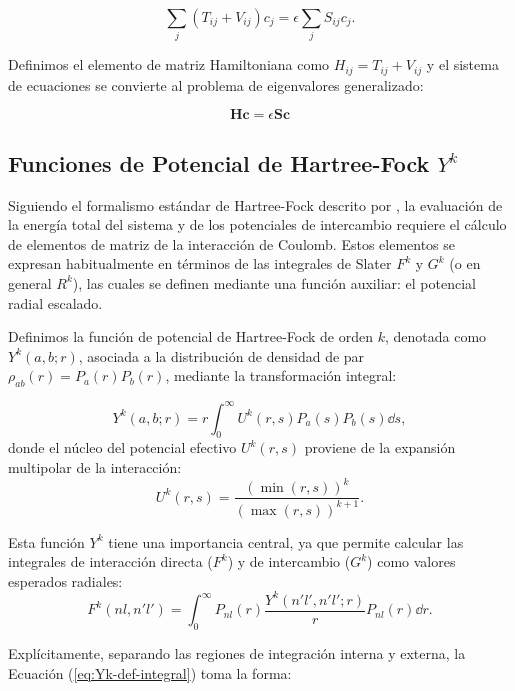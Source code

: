 \documentclass[12pt, a4paper, oneside, spanish]{book}
\begin{document}
\[ \sum_j (T_{ij} + V_{ij})c_j = \epsilon \sum_j S_{ij}c_j. \]

Definimos el elemento de matriz Hamiltoniana como \( H_{ij} = T_{ij} + V_{ij} \) y el sistema de ecuaciones se convierte al problema de eigenvalores generalizado:

\begin{equation}
\label{eq:eigen}
\bm{H}\bm{c} = \epsilon \bm{S}\bm{c}
\end{equation}

\subsection{Funciones de Potencial de Hartree-Fock $Y^k$}

Siguiendo el formalismo estándar de Hartree-Fock descrito por \textcite{fischer1977}, la evaluación de la energía total del sistema y de los potenciales de intercambio requiere el cálculo de elementos de matriz de la interacción de Coulomb. Estos elementos se expresan habitualmente en términos de las integrales de Slater $F^k$ y $G^k$ (o en general $R^k$), las cuales se definen mediante una función auxiliar: el potencial radial escalado.

Definimos la función de potencial de Hartree-Fock de orden $k$, denotada como $Y^k(a,b;r)$, asociada a la distribución de densidad de par $\rho_{ab}(r) = P_a(r)P_b(r)$, mediante la transformación integral:

\begin{equation}
\label{eq:Yk-def-integral}
    Y^k(a,b;r) = r \int_0^{\infty} U^k(r,s) P_a(s)P_b(s) \dd{s},
\end{equation}
donde el núcleo del potencial efectivo $U^k(r,s)$ proviene de la expansión multipolar de la interacción:
\begin{equation}
    U^k(r,s) = \frac{(\min(r,s))^k}{(\max(r,s))^{k+1}}.
\end{equation}

Esta función $Y^k$ tiene una importancia central, ya que permite calcular las integrales de interacción directa ($F^k$) y de intercambio ($G^k$) como valores esperados radiales:
\begin{equation}
    F^k(nl, n'l') = \int_0^{\infty} P_{nl}(r) \frac{Y^k(n'l', n'l'; r)}{r} P_{nl}(r) \dd{r}.
\end{equation}

Explícitamente, separando las regiones de integración interna y externa, la Ecuación (\ref{eq:Yk-def-integral}) toma la forma:
\end{document}
